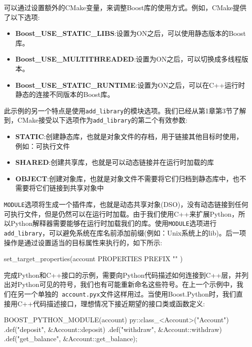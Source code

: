 可以通过设置额外的CMake变量，来调整Boost库的使用方式。例如，CMake提供了以下选项:

\begin{itemize}
\item \textbf{Boost\_USE\_STATIC\_LIBS}:设置为ON之后，可以使用静态版本的Boost库。

\item \textbf{Boost\_USE\_MULTITHREADED}:设置为ON之后，可以切换成多线程版本。

\item \textbf{Boost\_USE\_STATIC\_RUNTIME}:设置为ON之后，可以在C++运行时静态的连接不同版本的Boost库。

\end{itemize}

此示例的另一个特点是使用\texttt{add\_library}的模块选项。我们已经从第1章第3节了解到，CMake接受以下选项作为\texttt{add\_library}的第二个有效参数:

\begin{itemize}
\item \textbf{STATIC}:创建静态库，也就是对象文件的存档，用于链接其他目标时使用，例如：可执行文件

\item \textbf{SHARED}:创建共享库，也就是可以动态链接并在运行时加载的库

\item \textbf{OBJECT}:创建对象库，也就是对象文件不需要将它们归档到静态库中，也不需要将它们链接到共享对象中

\end{itemize}

\texttt{MODULE}选项将生成一个插件库，也就是动态共享对象(DSO)，没有动态链接到任何可执行文件，但是仍然可以在运行时加载。由于我们使用C++来扩展Python，所以Python解释器需要能够在运行时加载我们的库。使用\texttt{MODULE}选项进行\texttt{add\_library}，可以避免系统在库名前添加前缀(例如：Unix系统上的lib)。后一项操作是通过设置适当的目标属性来执行的，如下所示:

\begin{codebox}[cmake]
set_target_properties(account
  PROPERTIES
    PREFIX ""
  )
\end{codebox}

完成Python和C++接口的示例，需要向Python代码描述如何连接到C++层，并列出对Python可见的符号，我们也有可能重新命名这些符号。在上一个示例中，我们在另一个单独的\texttt{ account.pyx}文件这样用过。当使用Boost.Python时，我们直接用C++代码描述接口，理想情况下接近期望的接口类或函数定义:

\begin{codebox}[cpp]
BOOST_PYTHON_MODULE(account) {
  py::class_<Account>("Account")
    .def("deposit", &Account::deposit)
    .def("withdraw", &Account::withdraw)
    .def("get_balance", &Account::get_balance);
}
\end{codebox}


